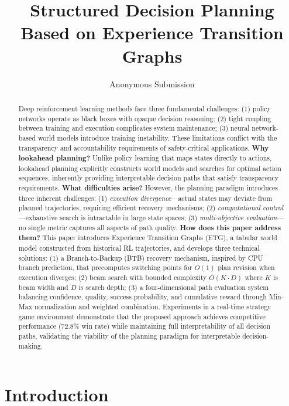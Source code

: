 \documentclass[letterpaper]{article}
\title{Structured Decision Planning Based on Experience Transition Graphs}
\author{
    Anonymous Submission
}
\begin{document}
\maketitle

\begin{abstract}
Deep reinforcement learning methods face three fundamental challenges: (1) policy networks operate as black boxes with opaque decision reasoning; (2) tight coupling between training and execution complicates system maintenance; (3) neural network-based world models introduce training instability. These limitations conflict with the transparency and accountability requirements of safety-critical applications. \textbf{Why lookahead planning?} Unlike policy learning that maps states directly to actions, lookahead planning explicitly constructs world models and searches for optimal action sequences, inherently providing interpretable decision paths that satisfy transparency requirements. \textbf{What difficulties arise?} However, the planning paradigm introduces three inherent challenges: (1) \textit{execution divergence}---actual states may deviate from planned trajectories, requiring efficient recovery mechanisms; (2) \textit{computational control}---exhaustive search is intractable in large state spaces; (3) \textit{multi-objective evaluation}---no single metric captures all aspects of path quality. \textbf{How does this paper address them?} This paper introduces Experience Transition Graphs (ETG), a tabular world model constructed from historical RL trajectories, and develops three technical solutions: (1) a Branch-to-Backup (BTB) recovery mechanism, inspired by CPU branch prediction, that precomputes switching points for $O(1)$ plan revision when execution diverges; (2) beam search with bounded complexity $O(K \cdot D)$ where $K$ is beam width and $D$ is search depth; (3) a four-dimensional path evaluation system balancing confidence, quality, success probability, and cumulative reward through Min-Max normalization and weighted combination. Experiments in a real-time strategy game environment demonstrate that the proposed approach achieves competitive performance (72.8\% win rate) while maintaining full interpretability of all decision paths, validating the viability of the planning paradigm for interpretable decision-making.
\end{abstract}

\section{Introduction}
\end{document}
